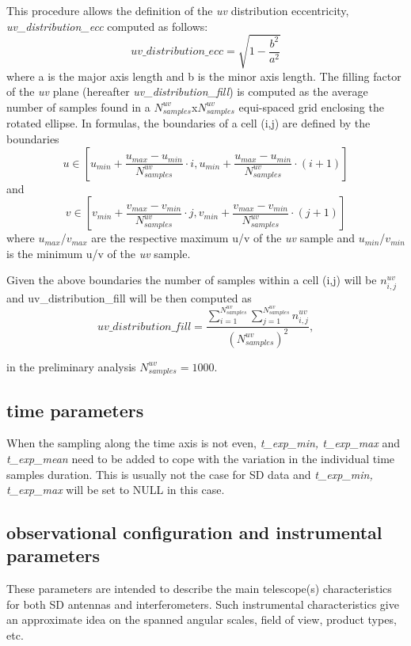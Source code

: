 \documentclass[11pt,a4paper]{ivoa}
\begin{document}
This procedure allows the definition of the \emph{uv} distribution eccentricity, \emph{uv\_distribution\_ecc} computed as follows:
\begin{equation}
uv\_distribution\_ecc = \sqrt{1-\frac{b^2}{a^2}}
\end{equation}
where a is the major axis length and b is the minor axis length.
The filling factor of the \emph{uv} plane (hereafter \emph{uv\_distribution\_fill}) is computed as the average
number of samples found in a $N^{uv}_{samples}$x$N^{uv}_{samples}$ equi-spaced grid enclosing the
rotated ellipse. In formulas, the boundaries of a cell (i,j) are defined by the boundaries
\begin{equation}
u \in [u_{min} + \frac{u_{max} - u_{min}}{N^{uv}_{samples}} \cdot i , u_{min} + \frac{u_{max} -
u_{min}}{N^{uv}_{samples}} \cdot (i + 1)]
\end{equation}
and
\begin{equation}
v \in [v_{min} + \frac{v_{max} - v_{min}}{N^{uv}_{samples}} \cdot j , v_{min} + \frac{v_{max} -
v_{min}}{N^{uv}_{samples}} \cdot (j + 1)]
\end{equation}
where $u_{max}$/$v_{max}$ are the respective maximum u/v of the \emph{uv} sample and
$u_{min}$/$v_{min}$ is the minimum u/v of the \emph{uv} sample.

Given the above boundaries the number of samples within a cell (i,j) will be $n^{uv}_{i,j}$
and uv\_distribution\_fill will be then computed as
\begin{equation}
uv\_distribution\_fill = \frac{\sum^{N^{uv}_{samples}}_{i=1} \sum^{N^{uv}_{samples}}_{j=1}
n^{uv}_{i,j} }{(N^{uv}_{samples}) ^ 2},
\end{equation}

in the preliminary analysis $N^{uv}_{samples} = 1000$.



\subsection{time parameters}
When the sampling along the time axis is not even, 
\emph{t\_exp\_min, t\_exp\_max} and \emph{t\_exp\_mean} need to be added to cope with the variation in the individual time samples
duration. This is usually not the case for SD data and \emph{t\_exp\_min, t\_exp\_max} will be set to NULL in this case.

\subsection{observational configuration and instrumental parameters}
These parameters are intended to describe the main telescope(s) characteristics for both SD antennas and interferometers. 
Such instrumental characteristics give an approximate idea on the spanned angular scales, field of view, product types, etc.
\end{document}

